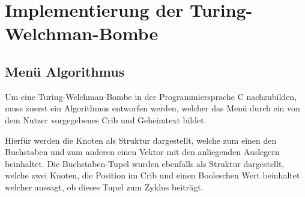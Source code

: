 \chapter{Implementierung der Turing-Welchman-Bombe}\label{ch:impl_bombe}


%
\section{Menü Algorithmus}\label{sec:cycle-finding-algorithm}
Um eine Turing-Welchman-Bombe in der Programmiersprache C nachzubilden, muss zuerst ein Algorithmus entworfen werden, welcher das Menü durch ein von dem Nutzer vorgegebenes Crib und 
Geheimtext bildet.

Hierfür werden die Knoten als Struktur dargestellt, welche zum einen den Buchstaben und zum anderen einen Vektor mit den anliegenden Auslegern beinhaltet. 
Die Buchstaben-Tupel wurden ebenfalls als Struktur dargestellt, welche zwei Knoten, die Position im Crib und einen Booleschen Wert beinhaltet welcher aussagt, ob dieses Tupel zum Zyklus beiträgt.




